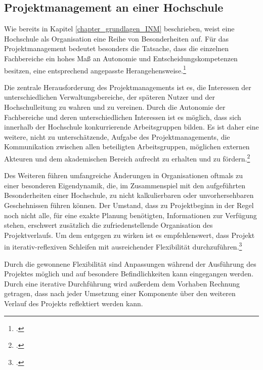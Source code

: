 
\subsection{Projektmanagement an einer Hochschule}
\label{subsection_projektmanagement_hochschule}
Wie bereits in Kapitel \ref{chapter_grundlagen_INM} beschrieben, weist eine Hochschule als Organisation eine Reihe von Besonderheiten auf. Für das Projektmanagement bedeutet besonders die Tatsache, dass die einzelnen Fachbereiche ein hohes Maß an Autonomie und Entscheidungskompetenzen besitzen, eine entsprechend angepasste Herangehensweise.\footcite{hansen_business_2009}

Die zentrale Herausforderung des Projektmanagements ist es, die Interessen der unterschiedlichen Verwaltungsbereiche, der späteren Nutzer und der Hochschulleitung zu wahren und zu vereinen. Durch die Autonomie der Fachbereiche und deren unterschiedlichen Interessen ist es möglich, dass sich innerhalb der Hochschule konkurrierende Arbeitsgruppen bilden. Es ist daher eine weitere, nicht zu unterschätzende, Aufgabe des Projektmanagements, die Kommunikation zwischen allen beteiligten Arbeitsgruppen, möglichen externen Akteuren und dem akademischen Bereich aufrecht zu erhalten und zu fördern.\footcite{altvater_organisation_2007}

Des Weiteren führen umfangreiche Änderungen in Organisationen oftmals zu einer besonderen Eigendynamik, die, im Zusammenspiel mit den aufgeführten Besonderheiten einer Hochschule, zu nicht kalkulierbaren oder unvorhersehbaren Geschehnissen führen können. Der Umstand, dass zu Projektbeginn in der Regel noch nicht alle, für eine exakte Planung benötigten, Informationen zur Verfügung stehen, erschwert zusätzlich die zufriedenstellende Organisation des Projektverlaufs. Um dem entgegen zu wirken ist es empfehlenswert, dass Projekt in iterativ-reflexiven Schleifen mit ausreichender Flexibilität durchzuführen.\footcite{hansen_business_2009}

Durch die gewonnene Flexibilität sind Anpassungen während der Ausführung des Projektes möglich und auf besondere Befindlichkeiten kann eingegangen werden. Durch eine iterative Durchführung wird außerdem dem Vorhaben Rechnung getragen, dass nach jeder Umsetzung einer Komponente über den weiteren Verlauf des Projekts reflektiert werden kann.

